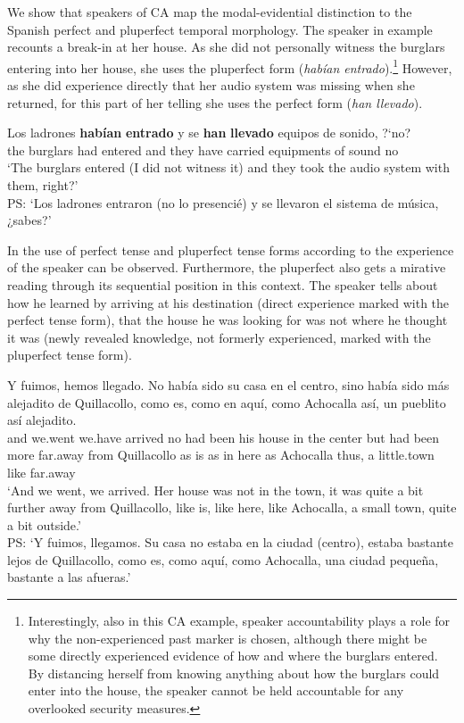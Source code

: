 \documentclass[output=paper,hidelinks]{langscibook}
\begin{document}
We show that speakers of CA map the modal-evidential distinction to the Spanish perfect and pluperfect temporal morphology. The speaker in example  recounts a break-in at her house. As she did not personally witness the burglars entering into her house, she uses the pluperfect form (\textit{habían entrado}).\footnote{Interestingly, also in this CA example, speaker accountability plays a role for why the non-experienced past marker is chosen, although there might be some directly experienced evidence of how and where the burglars entered. By distancing herself from knowing anything about how the burglars could enter into the house, the speaker cannot be held accountable for any overlooked security measures.} However, as she did experience directly that her audio system was missing when she returned, for this part of her telling she uses the perfect form (\textit{han llevado}).
\largerpage

\ea \label{ex:CAburgalar1}
\gll Los ladrones \textbf{habían} \textbf{entrado} y se \textbf{han} \textbf{llevado} equipos de sonido, ?`no? \\
the burglars had entered and they have carried equipments of sound no \\ 
\glt `The burglars entered (I did not witness it) and they took the audio system with them, right?' \citep{dankelpagel2012}\\
PS: `Los ladrones entraron (no lo presencié) y se llevaron el sistema de música, ¿sabes?'
\z

In  the use of perfect tense and pluperfect tense forms according to the experience of the speaker can be observed. Furthermore, the pluperfect also gets a mirative reading through its sequential position in this context. The speaker tells about how he learned by arriving at his destination (direct experience marked with the perfect tense form), that the house he was looking for was not where he thought it was (newly revealed knowledge, not formerly experienced, marked with the pluperfect tense form).

\ea \label{ex:hemos}
\gll Y fuimos, hemos llegado. No había sido su casa en el centro, sino había sido más alejadito de Quillacollo, como es, como en aquí, como Achocalla así, un pueblito así alejadito. \\
and we.went we.have arrived no had been his house in the center but had been more far.away from Quillacollo as is as in here as Achocalla thus, a little.town like far.away 
 \\ \glt ‘And we went, we arrived. Her house was not in the town, it was quite a bit further away from Quillacollo, like is, like here, like Achocalla, a small town, quite a bit outside.’ \citep[206]{RN20}\\
 PS: `Y fuimos, llegamos. Su casa no estaba en la ciudad (centro), estaba bastante lejos de Quillacollo, como es, como aquí, como Achocalla, una ciudad pequeña, bastante a las afueras.'
\z
\end{document}
